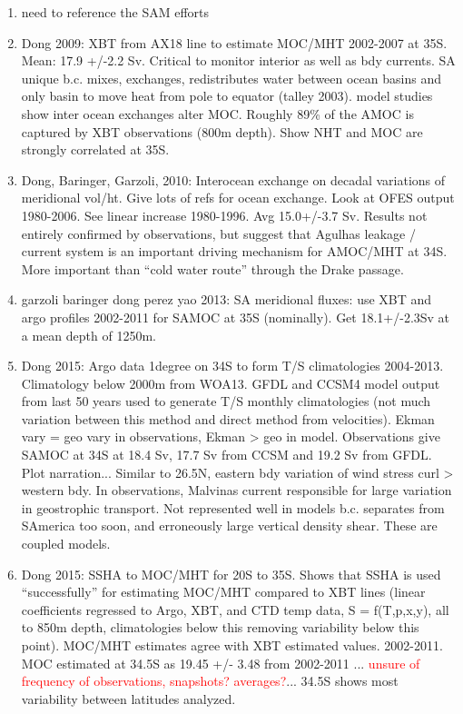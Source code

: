 \documentclass[a4paper,11pt]{article}
\newcommand{\red}[1]{\textcolor{red}{#1}}
\begin{document}
	\begin{enumerate}
	\item need to reference the SAM efforts
	\item Dong 2009: XBT from AX18 line to estimate MOC/MHT 2002-2007 at 35S. Mean: 17.9 +/-2.2 Sv. Critical to monitor interior as well as bdy currents. SA unique b.c. mixes, exchanges, redistributes water between ocean basins and only basin to move heat from pole to equator (talley 2003). model studies show inter ocean exchanges alter MOC. Roughly 89\% of the AMOC is captured by XBT observations (800m depth). Show NHT and MOC are strongly correlated at 35S. 
	\item Dong, Baringer, Garzoli, 2010: Interocean exchange on decadal variations of meridional vol/ht. Give lots of refs for ocean exchange. Look at OFES output 1980-2006. See linear increase 1980-1996. Avg 15.0+/-3.7 Sv. Results not entirely confirmed by observations, but suggest that Agulhas leakage / current system is an important driving mechanism for AMOC/MHT at 34S. More important than ``cold water route'' through the Drake passage. 
	\item garzoli baringer dong perez yao 2013: SA meridional fluxes: use XBT and argo profiles 2002-2011 for SAMOC at 35S (nominally). Get 18.1+/-2.3Sv at a mean depth of 1250m. 
	\item Dong 2015: Argo data 1degree on 34S to form T/S climatologies 2004-2013. Climatology below 2000m from WOA13. GFDL and CCSM4 model output from last 50 years used to generate T/S monthly climatologies (not much variation between this method and direct method from velocities). Ekman vary = geo vary in observations, Ekman > geo in model. Observations give SAMOC at 34S at 18.4 Sv, 17.7 Sv from CCSM and 19.2 Sv from GFDL. Plot narration... Similar to 26.5N, eastern bdy variation of wind stress curl > western bdy. In observations, Malvinas current responsible for large variation in geostrophic transport. Not represented well in models b.c. separates from SAmerica too soon, and erroneously large vertical density shear. These are coupled models. 
	\item Dong 2015: SSHA to MOC/MHT for 20S to 35S. Shows that SSHA is used ``successfully'' for estimating MOC/MHT compared to XBT lines (linear coefficients regressed to Argo, XBT, and CTD temp data, S = f(T,p,x,y), all to 850m depth, climatologies below this removing variability below this point). MOC/MHT estimates agree with XBT estimated values. 2002-2011. MOC estimated at 34.5S as 19.45 +/- 3.48 from 2002-2011 ... \red{unsure of frequency of observations, snapshots? averages?}... 34.5S shows most variability between latitudes analyzed. 
	\end{enumerate}
\end{document}
